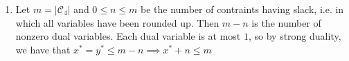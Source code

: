 \documentclass[letterpaper,11pt]{article}
\begin{document}
\begin{enumerate}
\begin{enumerate}
\begin{proof}
                    Suppose that all four variables were rounded. In order for
                    that to occur,
                    \begin{align*}
                        x_1 &> \frac{1}{2} \\
                        x_2 &> \frac{1}{2} \\
                        x_3 &> 0 \\
                        x_4 &> 0
                    \end{align*}
                    but this sum is greater that $1$, which contradicts the
                    premise of the implication. Hence, no more than $3$ of the
                    variables can be rounded in order for there to be no slack.
                \end{proof}

            \item
                Let $m = |\mathcal{C}_4|$ and $0 \leq n \leq m$ be the number
                of contraints having slack, i.e. in which all variables have
                been rounded up. Then $m - n$ is the number of nonzero dual
                variables. Each dual variable is at most $1$, so by strong
                duality, we have that
                $x^* = y^* \leq m - n \implies x^* + n \leq m$

        \end{enumerate}
\end{enumerate}
\end{document}
